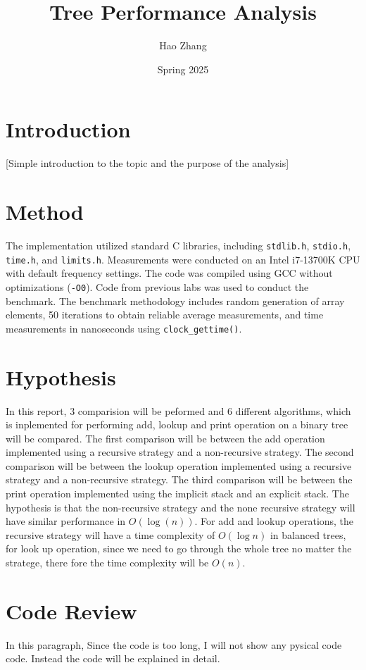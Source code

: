 \documentclass[a4paper,11pt]{article}
\begin{document}
\title{
\textbf{Tree Performance Analysis}
}
\author{Hao Zhang}
\date{Spring 2025}

\maketitle

\section*{Introduction}
[Simple introduction to the topic and the purpose of the analysis]

\section*{Method}
The implementation utilized standard C libraries, including \texttt{stdlib.h}, \texttt{stdio.h}, \texttt{time.h}, and \texttt{limits.h}. Measurements were conducted on an Intel i7-13700K CPU with default frequency settings. The code was compiled using GCC without optimizations (\texttt{-O0}). Code from previous labs was used to conduct the benchmark. The benchmark methodology includes random generation of array elements, 50 iterations to obtain reliable average measurements, and time measurements in nanoseconds using \texttt{clock\_gettime()}.

\section*{Hypothesis}
In this report, 3 comparision will be peformed and 6 different algorithms, which is inplemented for performing add, lookup and print operation on a binary tree will be compared. The first comparison will be between the add operation implemented using a recursive strategy and a non-recursive strategy. The second comparison will be between the lookup operation implemented using a recursive strategy and a non-recursive strategy. The third comparison will be between the print operation implemented using the implicit stack and an explicit stack. The hypothesis is that the non-recursive strategy and the none recursive strategy will have similar performance in $O(\log(n))$. For add and lookup operations, the recursive strategy will have a time complexity of $O(\log n)$ in balanced trees, for look up operation, since we need to go through the whole tree no matter the stratege, there fore the time complexity will be $O(n)$.

\section*{Code Review}
In this paragraph, Since the code is too long, I will not show any pysical code code. Instead the code will be explained in detail. 
\end{document}
